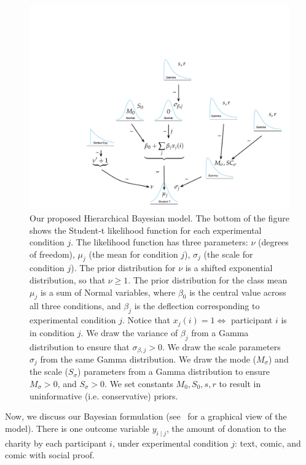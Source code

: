 \begin{figure}[htb]
    \centering
	\includegraphics[trim = 4in 0in 0in 4in, clip=true, width=1\textwidth]{./figures/gen_model.pdf}
    \caption{Our proposed Hierarchical Bayesian model. The bottom of the figure shows the Student-t likelihood function for each experimental condition $j$. The likelihood function has three parameters: $\nu$ (degrees of freedom), $\mu_j$ (the mean for condition $j$), $\sigma_j$ (the scale for condition $j$). The prior distribution for $\nu$ is a shifted exponential distribution, so that $\nu\geq 1$. The prior distribution for the class mean $\mu_j$ is a sum of Normal variables, where $\beta_0$ is the central value across all three conditions, and $\beta_j$ is the deflection corresponding to experimental condition $j$. Notice that $x_j(i) = 1 \iff$ participant $i$ is in condition $j$. We draw the variance of $\beta_j$ from a  Gamma distribution to ensure that $\sigma_{\beta, j} > 0$. We draw the scale parameters $\sigma_j$ from the same Gamma distribution. We draw the mode ($M_\sigma$) and the scale ($S_\sigma$) parameters from a Gamma distribution to ensure $M_\sigma>0$, and $S_\sigma > 0$. We set constants $M_0, S_0, s, r$ to result in uninformative (i.e. conservative) priors.
    }
	\label{fig:generative model}
\end{figure}



Now, we discuss our Bayesian formulation (see~ for a graphical view of the model). There is one outcome variable $y_{i \mid j}$, the amount of donation to the charity by each participant $i$, under experimental condition $j$: text, comic, and comic with social proof. 

